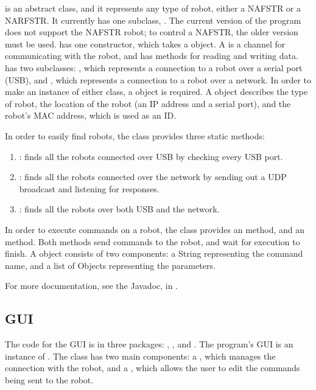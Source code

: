 \documentclass[letterpaper,10pt,english]{sphinxmanual}
\begin{document}
 is an abstract class, and it represents any type of robot, either a NAFSTR or a NARFSTR. It currently has one subclass, . The current version of the program does not support the NAFSTR robot; to control a NAFSTR, the older version must be used.  has one constructor, which takes a  object. A  is a channel for communicating with the robot, and has methods for reading and writing data.  has two subclasses: , which represents a connection to a robot over a serial port (USB), and , which represents a connection to a robot over a network. In order to make an instance of either class, a  object is required. A  object describes the type of robot, the location of the robot (an IP address and a serial port), and the robot's MAC address, which is used as an ID.

In order to easily find robots, the  class provides three static methods:
\begin{enumerate}
\item {} 
: finds all the robots connected over USB by checking every USB port.

\item {} 
: finds all the robots connected over the network by sending out a UDP broadcast and listening for responses.

\item {} 
: finds all the robots over both USB and the network.

\end{enumerate}

In order to execute commands on a robot, the  class provides an  method, and an  method. Both methods send commands to the robot, and wait for execution to finish. A  object consists of two components: a String representing the command name, and a list of Objects representing the parameters.

For more documentation, see the Javadoc, in .


\subsection{GUI}
\label{ProgramDevelopment:gui}
The code for the GUI is in three packages: , , and . The program's GUI is an instance of . The  class has two main components: a , which manages the connection with the robot, and a , which allows the user to edit the commands being sent to the robot.
\end{document}
